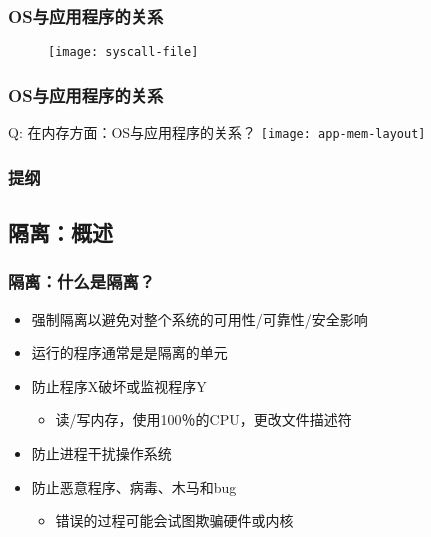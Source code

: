 
\begin{frame}
    
    \frametitle{OS与应用程序的关系}
    
    \begin{figure}
        \centering
        \texttt{[image: syscall-file]}
    \end{figure}
    
\end{frame}


\begin{frame}
    
    \frametitle{OS与应用程序的关系}
    Q: 在内存方面：OS与应用程序的关系？
            \centering
    \texttt{[image: app-mem-layout]}
    
\end{frame}

\begin{frame}
    \frametitle{提纲} 
    \tableofcontents 
\end{frame}

\subsection{隔离：概述} 
\begin{frame}
	\frametitle{隔离：\small{什么是隔离？}}
		\begin{itemize}

		\item 强制隔离以避免对整个系统的可用性/可靠性/安全影响
		\item 运行的程序通常是是隔离的单元
		\pause
		
		\item 防止程序X破坏或监视程序Y
			\begin{itemize}
			\item 读/写内存，使用100％的CPU，更改文件描述符
			\end{itemize}
		\item 防止进程干扰操作系统
		\item 防止恶意程序、病毒、木马和bug
			\begin{itemize}
			\item 错误的过程可能会试图欺骗硬件或内核
			\end{itemize}
		\end{itemize}
\end{frame}



